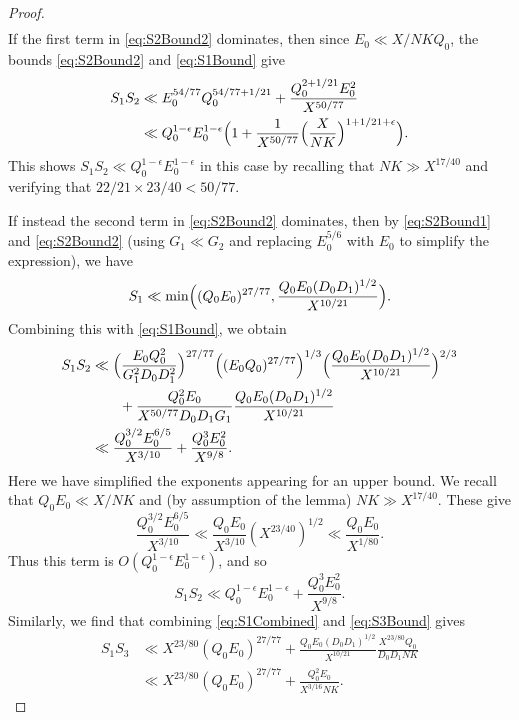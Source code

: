 \documentclass[10pt]{amsart}
\theoremstyle{plain}
\numberwithin{sblmm}{thrm}
\numberwithin{equation}{section}
\begin{document}
\begin{proof}
\begin{align}
\end{align}
%
If the first term in \eqref{eq:S2Bound2} dominates, then since $E_0\ll X/N K Q_0$, the bounds \eqref{eq:S2Bound2} and \eqref{eq:S1Bound} give
%
\begin{align*}
S_1S_2&\ll E_0^{54/77}Q_0^{54/77+1/21}+\frac{Q_0^{2+1/21} E_0^2}{X^{50/77}}\\
&\ll Q_0^{1-\epsilon} E_0^{1-\epsilon}\Bigl(1+\frac{1}{X^{50/77}}\Bigl(\frac{X}{N K}\Bigr)^{1+1/21+\epsilon}\Bigr).
\end{align*}
%
This shows $S_1 S_2\ll Q_0^{1-\epsilon}E_0^{1-\epsilon}$ in this case by recalling that $N K\gg X^{17/40}$ and verifying that $22/21\times 23/40<50/77$.

If instead the second term in \eqref{eq:S2Bound2} dominates, then by \eqref{eq:S2Bound1} and \eqref{eq:S2Bound2} (using $G_1\ll G_2$ and replacing $E_0^{5/6}$ with $E_0$ to simplify the expression), we have
%
\begin{equation}
S_1\ll \min\Bigl(( Q_0 E_0)^{27/77},\frac{Q_0 E_0 (D_0D_1)^{1/2}}{X^{10/21}}\Bigr).\label{eq:S1Combined}
\end{equation}
%
Combining this with \eqref{eq:S1Bound}, we obtain
%
\begin{align*}
S_1S_2
&\ll \Bigl(\frac{E_0 Q_0^{2}}{G_1^2 D_0 D_1^2}\Bigr)^{27/77}\Bigl((E_0 Q_0)^{27/77}\Bigr)^{1/3}\Bigl(\frac{Q_0 E_0 (D_0D_1)^{1/2}}{X^{10/21}}\Bigr)^{2/3}\nonumber\\
&\qquad+\frac{Q_0^2 E_0}{X^{50/77}D_0 D_1 G_1}\frac{Q_0E_0 (D_0 D_1)^{1/2}}{X^{10/21}}\\
&\ll \frac{Q_0^{3/2} E_0^{6/5} }{X^{3/10}}+\frac{Q_0^3 E_0^2}{X^{9/8}}.
\end{align*}
%
Here we have simplified the exponents appearing for an upper bound. We recall that $Q_0 E_0\ll X/N K$ and (by assumption of the lemma) $N K\gg X^{17/40}$. These give
\[
\frac{Q_0^{3/2} E_0^{6/5} }{X^{3/10}}\ll \frac{Q_0 E_0}{X^{3/10}}(X^{23/40})^{1/2}\ll \frac{Q_0 E_0}{X^{1/80}}.
\]
Thus this term is $O(Q_0^{1-\epsilon}E_0^{1-\epsilon})$, and so
\begin{equation}
S_1S_2\ll Q_0^{1-\epsilon}E_0^{1-\epsilon}+\frac{Q_0^3 E_0^2}{X^{9/8}}.\label{eq:S1S2Bound}
\end{equation}
Similarly, we find that combining \eqref{eq:S1Combined} and \eqref{eq:S3Bound} gives
%
\begin{align*}
S_1 S_3&\ll X^{23/80}(Q_0 E_0)^{27/77}+\frac{Q_0 E_0 (D_0D_1)^{1/2}}{X^{10/21}}\frac{X^{23/80}Q_0}{D_0D_1N K}\nonumber\\
&\ll X^{23/80}(Q_0 E_0)^{27/77}+ \frac{Q_0^{2} E_0}{X^{3/16}N K}.

\end{align*}
\end{proof}
\end{document}
